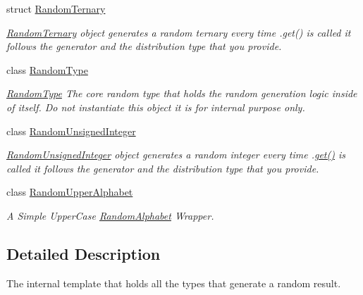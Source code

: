 \begin{DoxyCompactItemize}
struct \hyperlink{structtestcaser_1_1maker_1_1types_1_1RandomTernary}{Random\+Ternary}
\begin{DoxyCompactList}\small\item\em \hyperlink{structtestcaser_1_1maker_1_1types_1_1RandomTernary}{Random\+Ternary} object generates a random ternary every time .get() is called it follows the generator and the distribution type that you provide. \end{DoxyCompactList}\item 
class \hyperlink{classtestcaser_1_1maker_1_1types_1_1RandomType}{Random\+Type}
\begin{DoxyCompactList}\small\item\em \hyperlink{classtestcaser_1_1maker_1_1types_1_1RandomType}{Random\+Type} The core random type that holds the random generation logic inside of itself. Do not instantiate this object it is for internal purpose only. \end{DoxyCompactList}\item 
class \hyperlink{classtestcaser_1_1maker_1_1types_1_1RandomUnsignedInteger}{Random\+Unsigned\+Integer}
\begin{DoxyCompactList}\small\item\em \hyperlink{classtestcaser_1_1maker_1_1types_1_1RandomUnsignedInteger}{Random\+Unsigned\+Integer} object generates a random integer every time .\hyperlink{classtestcaser_1_1maker_1_1types_1_1RandomUnsignedInteger_a73504939f740445d56b0bd00257f5480}{get()} is called it follows the generator and the distribution type that you provide. \end{DoxyCompactList}\item 
class \hyperlink{classtestcaser_1_1maker_1_1types_1_1RandomUpperAlphabet}{Random\+Upper\+Alphabet}
\begin{DoxyCompactList}\small\item\em A Simple Upper\+Case \hyperlink{classtestcaser_1_1maker_1_1types_1_1RandomAlphabet}{Random\+Alphabet} Wrapper. \end{DoxyCompactList}\end{DoxyCompactItemize}


\subsection{Detailed Description}
The internal template that holds all the types that generate a random result. 